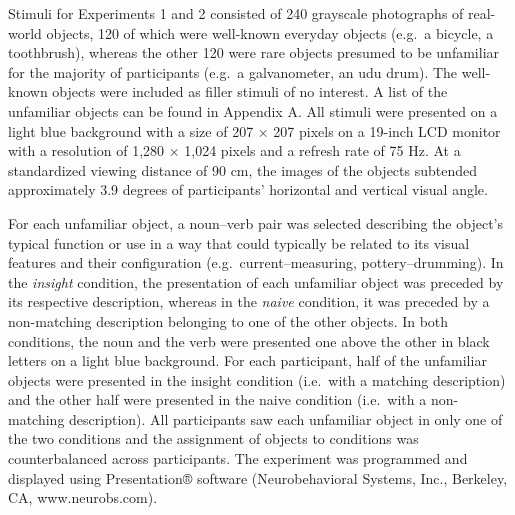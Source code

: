 \documentclass[
  english,
  man,11pt,floatsintext]{apa7}
\begin{document}
Stimuli for Experiments 1 and 2 consisted of 240 grayscale photographs of real-world objects, 120 of which were well-known everyday objects (e.g.~a bicycle, a toothbrush), whereas the other 120 were rare objects presumed to be unfamiliar for the majority of participants (e.g.~a galvanometer, an udu drum). The well-known objects were included as filler stimuli of no interest. A list of the unfamiliar objects can be found in Appendix A. All stimuli were presented on a light blue background with a size of 207 × 207 pixels on a 19-inch LCD monitor with a resolution of 1,280 × 1,024 pixels and a refresh rate of 75 Hz. At a standardized viewing distance of 90 cm, the images of the objects subtended approximately 3.9 degrees of participants' horizontal and vertical visual angle.

For each unfamiliar object, a noun--verb pair was selected describing the object's typical function or use in a way that could typically be related to its visual features and their configuration (e.g.~current--measuring, pottery--drumming). In the \emph{insight} condition, the presentation of each unfamiliar object was preceded by its respective description, whereas in the \emph{naive} condition, it was preceded by a non-matching description belonging to one of the other objects. In both conditions, the noun and the verb were presented one above the other in black letters on a light blue background. For each participant, half of the unfamiliar objects were presented in the insight condition (i.e.~with a matching description) and the other half were presented in the naive condition (i.e.~with a non-matching description). All participants saw each unfamiliar object in only one of the two conditions and the assignment of objects to conditions was counterbalanced across participants. The experiment was programmed and displayed using Presentation® software (Neurobehavioral Systems, Inc., Berkeley, CA, www.neurobs.com).
\end{document}
